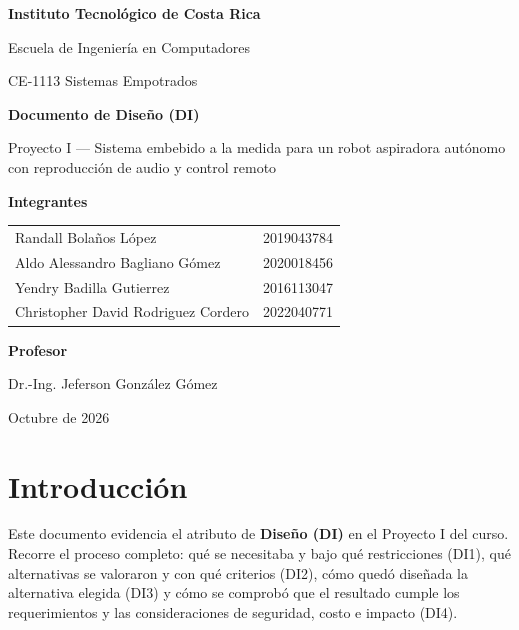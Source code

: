 \documentclass[11pt,a4paper]{article}
\begin{document}
\begin{titlepage}
\centering
{\large\bfseries Instituto Tecnológico de Costa Rica\par}
\vspace{0.3cm}
{\large Escuela de Ingeniería en Computadores\par}
\vspace{0.3cm}
{\large CE-1113 Sistemas Empotrados\par}
\vspace{3.2cm}
{\LARGE\bfseries Documento de Diseño (DI)\par}
\vspace{0.6cm}
{\Large Proyecto I --- Sistema embebido a la medida para un robot aspiradora
autónomo con reproducción de audio y control remoto\par}
\vspace{3.2cm}
{\large\bfseries Integrantes\par}
\vspace{0.2cm}
{\large
\begin{tabular}{ll}
Randall Bolaños López & 2019043784 \\
Aldo Alessandro Bagliano Gómez & 2020018456 \\
Yendry Badilla Gutierrez & 2016113047 \\
Christopher David Rodriguez Cordero & 2022040771 \\
\end{tabular}\par}
\vspace{1.6cm}
{\large\bfseries Profesor\par}
\vspace{0.2cm}
{\large Dr.-Ing. Jeferson González Gómez\par}
\vfill
{\large Octubre de 2026\par}
\end{titlepage}

\tableofcontents
\newpage

\section{Introducción}

Este documento evidencia el atributo de \textbf{Diseño (DI)} en el Proyecto I
del curso. Recorre el proceso completo: qué se necesitaba y bajo qué
restricciones (DI1), qué alternativas se valoraron y con qué criterios (DI2),
cómo quedó diseñada la alternativa elegida (DI3) y cómo se comprobó que el
resultado cumple los requerimientos y las consideraciones de seguridad, costo
e impacto (DI4).
\end{document}
